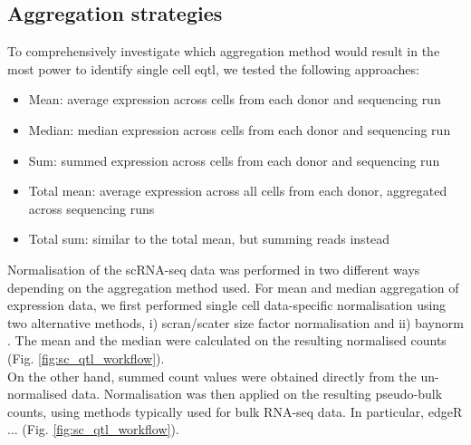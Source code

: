 \subsection{Aggregation strategies}

To comprehensively investigate which aggregation method would result in the most power to identify single cell \gls{eqtl}, we tested the following approaches:

\begin{itemize}
    \item Mean: average expression across cells from each donor and sequencing run
    \item Median: median expression across cells from each donor and sequencing run
    \item Sum: summed expression across cells from each donor and sequencing run
    \item Total mean: average expression across all cells from each donor, aggregated across sequencing runs
    \item Total sum: similar to the total mean, but summing reads instead
\end{itemize}


Normalisation of the scRNA-seq data was performed in two different ways depending on the aggregation method used.
For mean and median aggregation of expression data, we first performed single cell data-specific normalisation using two alternative methods, i) scran/scater \cite{mccarthy2017scater} size factor normalisation and ii) baynorm \cite{tang2020baynorm}.
The mean and the median were calculated on the resulting normalised counts (Fig. \ref{fig:sc_qtl_workflow}). \\

On the other hand, summed count values were obtained directly from the un-normalised data.
Normalisation was then applied on the resulting pseudo-bulk counts, using methods typically used for bulk RNA-seq data.
In particular, edgeR \cite{robinson2010edger}... (Fig. \ref{fig:sc_qtl_workflow}).\\



